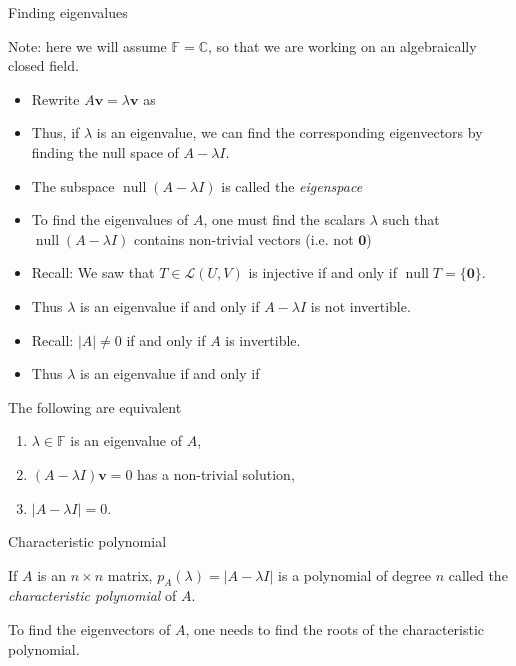 \documentclass [aspectratio=169]{beamer}
\newcommand{\bv}{{\mathbf{v}}}
\newcommand{\zerovec}{{\mathbf{0}}}
\newcommand{\C}{{\mathbb{C}}}
\newcommand{\F}{{\mathbb{F}}}
\newcommand{\cL}{{\mathcal{L}}}
\DeclareMathOperator{\nullspace}{null}
\begin{document}
\begin{frame}{Finding eigenvalues}

Note: here we will assume $\F = \C$, so that we are working on an algebraically closed field.

\vspace{0.5em}

\begin{itemize}
\item Rewrite $A \bv = \lambda \bv$ as  %
\item Thus, if $\lambda$ is an eigenvalue, we can find the corresponding eigenvectors by finding the null space of $A - \lambda I$.
\item The subspace $\nullspace (A - \lambda I)$ is called the \emph{eigenspace}
\item To find the eigenvalues of $A$, one must find the scalars $\lambda$ such that $\nullspace (A - \lambda I)$ contains non-trivial vectors (i.e. not $\zerovec$)
\item Recall: We saw that $T \in \cL(U,V)$ is injective if and only if $\nullspace T = \{ \zerovec \}$.
\item Thus $\lambda$ is an eigenvalue if and only if $A - \lambda I$ is not invertible.
\item Recall: $|A| \neq 0$ if and only if $A$ is invertible.
\item Thus $\lambda$ is an eigenvalue if and only if %
\end{itemize}

\end{frame}


\begin{frame}
\begin{theorem}
The following are equivalent
\begin{enumerate}
    \item $\lambda\in \F$ is an eigenvalue of $A$,
    \item $(A-\lambda I)\bv = 0$ has a non-trivial solution,
    \item $|A-\lambda I|= 0$.
\end{enumerate}
\end{theorem}
\end{frame}


\begin{frame}{Characteristic polynomial}
\begin{definition}
If $A$ is an $n\times n$ matrix, $p_A(\lambda) = |A-\lambda I|$ is a polynomial of degree $n$ called the \emph{characteristic polynomial} of $A$.
\end{definition}

To find the eigenvectors of $A$, one needs to find the roots of the characteristic polynomial.
\end{frame}
\end{document}
